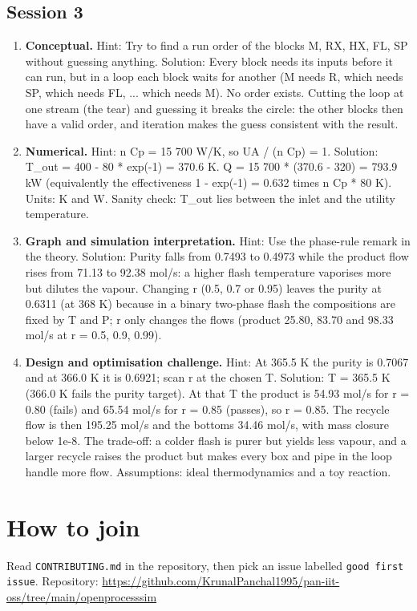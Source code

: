 \documentclass[11pt,a4paper]{article}
\begin{document}
\subsection*{Session 3}
\begin{enumerate}[nosep]
\item \textbf{Conceptual.} Hint: Try to find a run order of the blocks M, RX, HX, FL, SP without guessing anything. Solution: Every block needs its inputs before it can run, but in a loop each block waits for another (M needs R, which needs SP, which needs FL, ... which needs M). No order exists. Cutting the loop at one stream (the tear) and guessing it breaks the circle: the other blocks then have a valid order, and iteration makes the guess consistent with the result.
\item \textbf{Numerical.} Hint: n Cp = 15 700 W/K, so UA / (n Cp) = 1. Solution: T\_out = 400 - 80 * exp(-1) = 370.6 K. Q = 15 700 * (370.6 - 320) = 793.9 kW (equivalently the effectiveness 1 - exp(-1) = 0.632 times n Cp * 80 K). Units: K and W. Sanity check: T\_out lies between the inlet and the utility temperature.
\item \textbf{Graph and simulation interpretation.} Hint: Use the phase-rule remark in the theory. Solution: Purity falls from 0.7493 to 0.4973 while the product flow rises from 71.13 to 92.38 mol/s: a higher flash temperature vaporises more but dilutes the vapour. Changing r (0.5, 0.7 or 0.95) leaves the purity at 0.6311 (at 368 K) because in a binary two-phase flash the compositions are fixed by T and P; r only changes the flows (product 25.80, 83.70 and 98.33 mol/s at r = 0.5, 0.9, 0.99).
\item \textbf{Design and optimisation challenge.} Hint: At 365.5 K the purity is 0.7067 and at 366.0 K it is 0.6921; scan r at the chosen T. Solution: T = 365.5 K (366.0 K fails the purity target). At that T the product is 54.93 mol/s for r = 0.80 (fails) and 65.54 mol/s for r = 0.85 (passes), so r = 0.85. The recycle flow is then 195.25 mol/s and the bottoms 34.46 mol/s, with mass closure below 1e-8. The trade-off: a colder flash is purer but yields less vapour, and a larger recycle raises the product but makes every box and pipe in the loop handle more flow. Assumptions: ideal thermodynamics and a toy reaction.
\end{enumerate}

\section{How to join}
Read \texttt{CONTRIBUTING.md} in the repository, then pick an issue labelled \texttt{good first issue}. Repository: \url{https://github.com/KrunalPanchal1995/pan-iit-oss/tree/main/openprocesssim}
\end{document}
